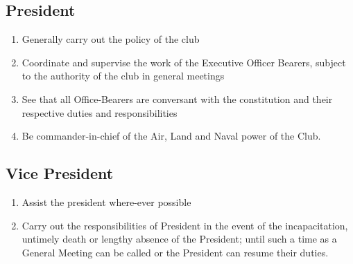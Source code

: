 \documentclass[10pt,a4paper]{report}
\begin{document}
		\subsection{President}
			\begin{enumerate}[label=\alph*]
				\item Generally carry out the policy of the club
				\item Coordinate and supervise the work of the Executive Officer Bearers, subject to the authority of the club in general meetings
				\item See that all Office-Bearers are conversant with the constitution and their respective duties and responsibilities
				\item Be commander-in-chief of the Air, Land and Naval power of the Club.
			\end{enumerate}
		\subsection{Vice President}
			\begin{enumerate}[label=\alph*]
				\item Assist the president where-ever possible
				\item Carry out the responsibilities of President in the event of the incapacitation, untimely death or lengthy absence of the President; until such a time as a General Meeting can be called or the President can resume their duties.
			\end{enumerate}
\end{document}

